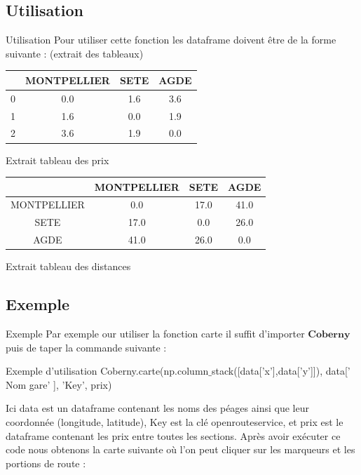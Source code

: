 \documentclass{beamer}
\begin{document}
\subsection{Utilisation}
\begin{frame}[fragile]{Utilisation}
Pour utiliser cette fonction les dataframe doivent être de la forme suivante : (extrait des tableaux)
\begin{center}
\begin{tabular}{|*{4}{c|}}
\hline
&MONTPELLIER&SETE&AGDE \\
\hline
0&0.0&1.6&3.6\\
\hline
1&1.6&0.0&1.9 \\
\hline
2&3.6&1.9&0.0\\
\hline
\end{tabular} \newline
Extrait tableau des prix
\end{center}
\begin{center}
\begin{tabular}{|*{4}{c|}}
\hline
&MONTPELLIER&SETE&AGDE \\
\hline
MONTPELLIER&0.0&17.0&41.0\\
\hline
SETE&17.0&0.0&26.0 \\
\hline
AGDE&41.0&26.0&0.0\\
\hline
\end{tabular} \newline
Extrait tableau des distances
\end{center}
\end{frame}

\subsection{Exemple}
\begin{frame}[fragile]{Exemple}
Par exemple our utiliser la fonction carte il suffit d'importer $\textbf{Coberny}$ puis de taper la commande suivante : 
\begin{block}{Exemple d'utilisation}
Coberny.carte(np.column$\_$stack([data['x'],data['y']]), data[' Nom gare' ], 'Key', prix)
\end{block}
Ici data est un dataframe contenant les noms des péages ainsi que leur coordonnée (longitude, latitude), Key est la clé openrouteservice, et prix est le dataframe contenant les prix entre toutes les sections.
Après avoir exécuter ce code nous obtenons la carte suivante où l'on peut cliquer sur les marqueurs et les portions de route : 
\end{frame}
\end{document}
